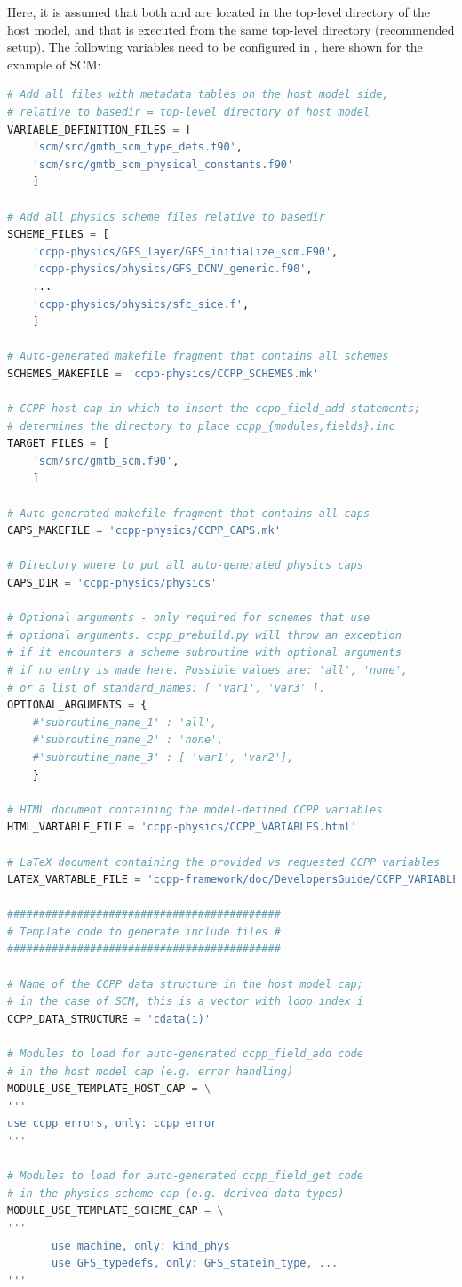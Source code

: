 Here, it is assumed that both  and  are located in the top-level directory of the host model, and that  is executed from the same top-level directory (recommended setup). The following variables need to be configured in , here shown for the example of SCM:
\begin{lstlisting}[language=python]
# Add all files with metadata tables on the host model side,
# relative to basedir = top-level directory of host model
VARIABLE_DEFINITION_FILES = [
    'scm/src/gmtb_scm_type_defs.f90',
    'scm/src/gmtb_scm_physical_constants.f90'
    ]

# Add all physics scheme files relative to basedir
SCHEME_FILES = [
    'ccpp-physics/GFS_layer/GFS_initialize_scm.F90',
    'ccpp-physics/physics/GFS_DCNV_generic.f90',
    ...
    'ccpp-physics/physics/sfc_sice.f',
    ]

# Auto-generated makefile fragment that contains all schemes
SCHEMES_MAKEFILE = 'ccpp-physics/CCPP_SCHEMES.mk'

# CCPP host cap in which to insert the ccpp_field_add statements;
# determines the directory to place ccpp_{modules,fields}.inc
TARGET_FILES = [
    'scm/src/gmtb_scm.f90',
    ]

# Auto-generated makefile fragment that contains all caps
CAPS_MAKEFILE = 'ccpp-physics/CCPP_CAPS.mk'

# Directory where to put all auto-generated physics caps
CAPS_DIR = 'ccpp-physics/physics'

# Optional arguments - only required for schemes that use
# optional arguments. ccpp_prebuild.py will throw an exception
# if it encounters a scheme subroutine with optional arguments
# if no entry is made here. Possible values are: 'all', 'none',
# or a list of standard_names: [ 'var1', 'var3' ].
OPTIONAL_ARGUMENTS = {
    #'subroutine_name_1' : 'all',
    #'subroutine_name_2' : 'none',
    #'subroutine_name_3' : [ 'var1', 'var2'],
    }

# HTML document containing the model-defined CCPP variables
HTML_VARTABLE_FILE = 'ccpp-physics/CCPP_VARIABLES.html'

# LaTeX document containing the provided vs requested CCPP variables
LATEX_VARTABLE_FILE = 'ccpp-framework/doc/DevelopersGuide/CCPP_VARIABLES.tex'

###########################################
# Template code to generate include files #
###########################################

# Name of the CCPP data structure in the host model cap;
# in the case of SCM, this is a vector with loop index i
CCPP_DATA_STRUCTURE = 'cdata(i)'

# Modules to load for auto-generated ccpp_field_add code
# in the host model cap (e.g. error handling)
MODULE_USE_TEMPLATE_HOST_CAP = \
'''
use ccpp_errors, only: ccpp_error
'''

# Modules to load for auto-generated ccpp_field_get code
# in the physics scheme cap (e.g. derived data types)
MODULE_USE_TEMPLATE_SCHEME_CAP = \
'''
       use machine, only: kind_phys
       use GFS_typedefs, only: GFS_statein_type, ...
'''
\end{lstlisting}

